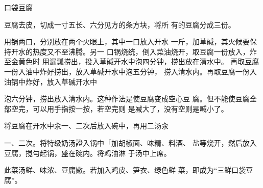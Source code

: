 \begin{recipe}{口袋豆腐}

\ingredients



\cooking

\step 豆腐去皮，切成一寸五长、六分见方的条方块，将所 有的豆腐分成三份。

用锅两口，分别放在两个火眼上，其中一口放入开水 一斤，加草碱，其火候要保持开水的热度又不至沸腾。另一 口锅烧统，倒入菜油烧开，取豆腐一份放入，炸至金黄色时 用漏瓢捞出，投入草碱开水中泡四分钟，捞出放在清水中。 再取豆腐一份入油中炸好捞出，放入草碱开水中泡五分钟， 捞入清水内。再取豆腐一份入油锅中炸好，放入草碱开水中

泡六分钟，捞出放入清水内。这种作法是使豆腐变成空心豆 腐。但不能使豆腐全部空完，可以用手指按一按，若空完则 是减大了，没有空则是喊小了。

将豆腐在开水中汆一、二次后放入碗中，再用二汤汆

一、二次。将特级奶汤證入锅中「加胡椒面、味精、料酒、 盐等烧开，然后放入豆腐，搅勻起锅，盛在碗内。将鸡油淋 于汤中上席。

\notes

此菜汤鲜、味浓、豆腐嫩。若加入鸡皮、笋衣、绿色鲜 菜，即成为“三鲜口袋豆腐”。

\end{recipe}

